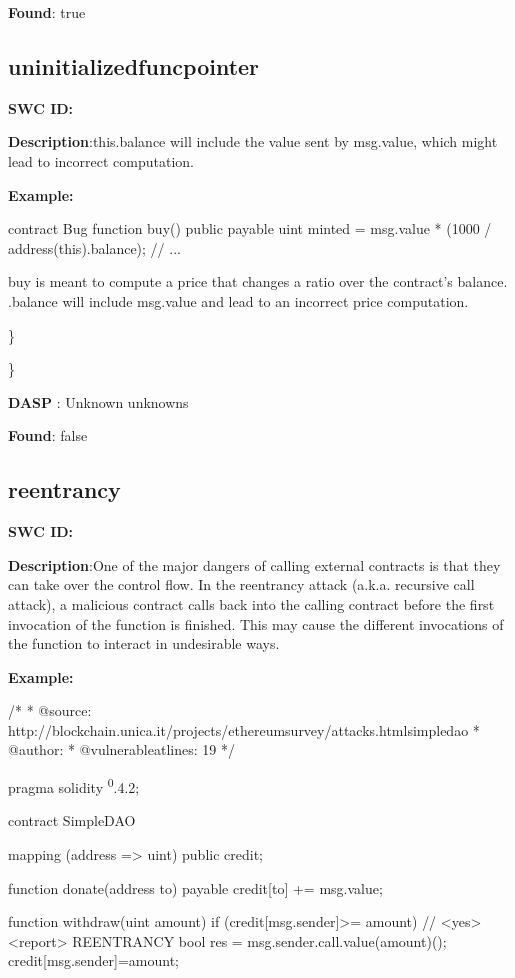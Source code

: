 \documentclass{article}
\begin{document}
\textbf{Found}: true

\subsection{uninitialized\textunderscore func\textunderscore pointer} 
\textbf{SWC \textunderscore ID:} 

\textbf{Description}:this.balance will include the value sent by msg.value, which might lead to incorrect computation.


\textbf{Example:} 

contract Bug{
  function buy() public payable{
    uint minted = msg.value * (1000 / address(this).balance);
    // ...
  }
}

buy is meant to compute a price that changes a ratio over the contract's balance. .balance will include msg.value and lead to an incorrect price computation.

\} 

\} 

\textbf{DASP} : Unknown unknowns

\textbf{Found}: false

\subsection{reentrancy} 
\textbf{SWC \textunderscore ID:} 

\textbf{Description}:One of the major dangers of calling external contracts is that they can take over the control flow. In the reentrancy attack (a.k.a. recursive call attack), a malicious contract calls back into the calling contract before the first invocation of the function is finished. This may cause the different invocations of the function to interact in undesirable ways.


\textbf{Example:} 

/*
* @source: http://blockchain.unica.it/projects/ethereum\textendash survey/attacks.htmlsimpledao
* @author: \textendash 
* @vulnerable\textunderscore at\textunderscore lines: 19
*/

pragma solidity \textsuperscript0.4.2;

contract SimpleDAO {
  mapping (address => uint) public credit;

  function donate(address to) payable {
    credit[to] += msg.value;
  }

  function withdraw(uint amount) {
    if (credit[msg.sender]>= amount) {
      // <yes> <report> REENTRANCY
      bool res = msg.sender.call.value(amount)();
      credit[msg.sender]\textendash =amount;
    }
  }
}
\end{document}
